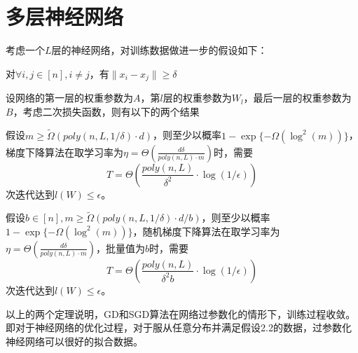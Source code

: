 \section{多层神经网络}
考虑一个$L$层的神经网络，对训练数据做进一步的假设如下：
\begin{assumption}
对$\forall i,j\in [n], i\neq j$，有$\|x_i-x_j\|\geq \delta$
\end{assumption}
\par
设网络的第一层的权重参数为$A$，第$l$层的权重参数为$W_l$，最后一层的权重参数为$B$，考虑二次损失函数，则有以下的两个结果\cite{allen2018convergence}
\begin{theorem}
假设$m\geq \tilde{\Omega}(poly(n,L,1/\delta)\cdot d)$，则至少以概率$1-\exp\{-\Omega(\log^2(m))\}$，梯度下降算法在取学习率为$\eta = \Theta(\frac{d\delta}{poly(n,L)\cdot m})$时，需要
\[
T = \Theta(\frac{poly(n,L)}{\delta^2}\cdot \log(1/\epsilon))
\]
次迭代达到$l(W)\leq \epsilon$。
\end{theorem}
\begin{theorem}
假设$b\in [n], m\geq \tilde{\Omega}(poly(n,L,1/\delta)\cdot d/b)$，则至少以概率$1-\exp\{-\Omega(\log^2(m))\}$，随机梯度下降算法在取学习率为$\eta = \Theta(\frac{d\delta}{poly(n,L)\cdot m})$，批量值为$b$时，需要
\[
T = \Theta(\frac{poly(n,L)}{\delta^2b}\cdot \log(1/\epsilon))
\]
次迭代达到$l(W)\leq \epsilon$。
\end{theorem}
\par
以上的两个定理说明，GD和SGD算法在网络过参数化的情形下，训练过程收敛。即对于神经网络的优化过程，对于服从任意分布并满足假设2.2的数据，过参数化神经网络可以很好的拟合数据。

